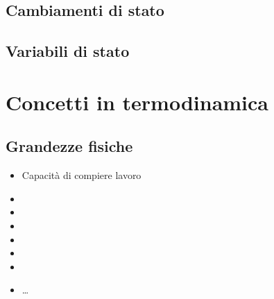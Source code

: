 \documentclass[letterpaper,10pt,italian]{jupyterBook}
\begin{document}
\subsection{Cambiamenti di stato}
\label{\detokenize{ch/thermodynamics/foundation-atomic-theory:cambiamenti-di-stato}}

\subsection{Variabili di stato}
\label{\detokenize{ch/thermodynamics/foundation-atomic-theory:variabili-di-stato}}
\sphinxstepscope


\section{Concetti in termodinamica}
\label{\detokenize{ch/thermodynamics/foundation-vocabulary:concetti-in-termodinamica}}\label{\detokenize{ch/thermodynamics/foundation-vocabulary:physics-hs-thermodynamics-foundation-vocabulary}}\label{\detokenize{ch/thermodynamics/foundation-vocabulary::doc}}

\subsection{Grandezze fisiche}
\label{\detokenize{ch/thermodynamics/foundation-vocabulary:grandezze-fisiche}}\begin{itemize}
\item {} 
\sphinxAtStartPar
{} Capacità di compiere lavoro

\item {} 
\sphinxAtStartPar
{}

\item {} 
\sphinxAtStartPar
{}

\item {} 
\sphinxAtStartPar
{}

\item {} 
\sphinxAtStartPar
{}

\item {} 
\sphinxAtStartPar
{}

\item {} 
\sphinxAtStartPar
{}

\item {} 
\sphinxAtStartPar
…

\end{itemize}
\end{document}
